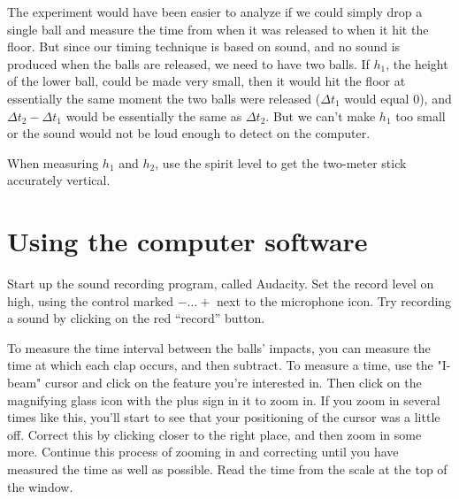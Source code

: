 The experiment would have been easier to analyze if we could
simply drop a single ball and measure the time from when it
was released to when it hit the floor.  But since our timing
technique is based on sound, and no sound is produced when
the balls are released, we need to have two balls.  If
$h_1$, the height of the lower ball, could be made very
small, then it would hit the floor at essentially the same
moment the two balls were released ($\Delta t_1$ would equal 0),
and $\Delta t_2-\Delta t_1$ would be essentially the same as $\Delta t_2$.  But
we can't make $h_1$ too small or the sound would not be loud
enough to detect on the computer.

When measuring $h_1$ and $h_2$, use the spirit level to get the
two-meter stick accurately vertical.

\section*{Using the computer software}

Start up the sound recording program, called Audacity.
Set the record level on high, using the control marked $-\ldots +$ next to
the microphone icon. Try recording a sound by clicking on the red ``record'' button.


To measure the time interval between the balls' impacts, you can measure the time at which
each clap occurs, and then subtract. To measure a time, 
use the "I-beam" cursor and click on the feature you're interested in.
Then click on the magnifying glass icon with the plus sign in it to zoom in.
If you zoom in several times like this, you'll start to see that your positioning
of the cursor was a little off. Correct this by clicking closer to the right place,
and then zoom in some more. Continue this process of zooming in and correcting
until you have measured the time as well as possible.
Read the time from the scale at the top of the window.

